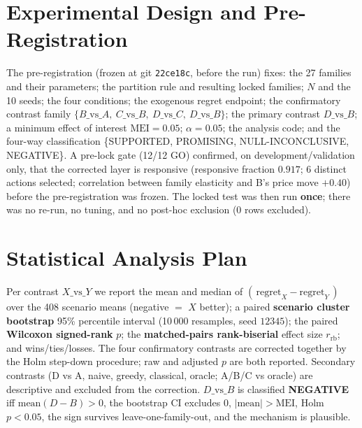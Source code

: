 \documentclass[conference]{IEEEtran}
\newcommand{\code}[1]{\texttt{#1}}
\newcommand{\dvb}{\ensuremath{D\!-\!B}}
\newcommand{\rb}{\ensuremath{r_{\mathrm{rb}}}}
\begin{document}
\section{Experimental Design and Pre-Registration}\label{sec:design}
The pre-registration (frozen at git \code{22ce18c}, before the run) fixes: the
27 families and their parameters; the partition rule and resulting locked
families; $N$ and the 10 seeds; the four conditions; the exogenous regret
endpoint; the confirmatory contrast family
$\{B\text{\_vs\_}A,\ C\text{\_vs\_}B,\ D\text{\_vs\_}C,\ D\text{\_vs\_}B\}$;
the primary contrast $D\text{\_vs\_}B$; a minimum effect of interest
$\mathrm{MEI}=0.05$; $\alpha=0.05$; the analysis code; and the four-way
classification \{SUPPORTED, PROMISING, NULL-INCONCLUSIVE, NEGATIVE\}. A pre-lock
gate (12/12 GO) confirmed, on development/validation only, that the corrected
layer is responsive (responsive fraction $0.917$; 6 distinct actions selected;
correlation between family elasticity and B's price move $+0.40$) before the
pre-registration was frozen. The locked test was then run \textbf{once}; there
was no re-run, no tuning, and no post-hoc exclusion (0 rows excluded).

\section{Statistical Analysis Plan}\label{sec:stats}
Per contrast $X\text{\_vs\_}Y$ we report the mean and median of
$(\,\mathrm{regret}_X-\mathrm{regret}_Y\,)$ over the 408 scenario means
(negative $=$ $X$ better); a paired \textbf{scenario cluster bootstrap} 95\%
percentile interval (10\,000 resamples, seed $12345$); the paired
\textbf{Wilcoxon signed-rank} $p$; the \textbf{matched-pairs rank-biserial}
effect size \rb; and wins/ties/losses. The four confirmatory contrasts are
corrected together by the Holm step-down procedure; raw and adjusted $p$ are
both reported. Secondary contrasts (D vs A, naive, greedy, classical, oracle;
A/B/C vs oracle) are descriptive and excluded from the correction.
$D\text{\_vs\_}B$ is classified \textbf{NEGATIVE} iff
$\mathrm{mean}(\dvb)>0$, the bootstrap CI excludes $0$, $|\mathrm{mean}|>\mathrm{MEI}$,
Holm $p<0.05$, the sign survives leave-one-family-out, and the mechanism is
plausible.

\end{document}
